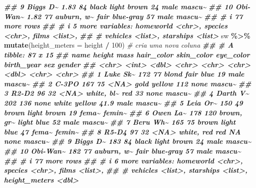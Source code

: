 \documentclass[
  portuguese,
  11pt,
  openany]{book}
\newenvironment{Shaded}{\begin{snugshade}}{\end{snugshade}}
\newcommand{\AttributeTok}[1]{\textcolor[rgb]{0.13,0.29,0.53}{#1}}
\newcommand{\CommentTok}[1]{\textcolor[rgb]{0.56,0.35,0.01}{\textit{#1}}}
\newcommand{\DecValTok}[1]{\textcolor[rgb]{0.00,0.00,0.81}{#1}}
\newcommand{\DocumentationTok}[1]{\textcolor[rgb]{0.56,0.35,0.01}{\textbf{\textit{#1}}}}
\newcommand{\FunctionTok}[1]{\textcolor[rgb]{0.13,0.29,0.53}{\textbf{#1}}}
\newcommand{\NormalTok}[1]{#1}
\newcommand{\SpecialCharTok}[1]{\textcolor[rgb]{0.81,0.36,0.00}{\textbf{#1}}}
\newcounter{none} %
\begin{document}
\begin{Shaded}
\begin{Highlighting}[]
\DocumentationTok{\#\#  9 Biggs D\textasciitilde{}   1.83    84 black      light      brown           24   male  mascu\textasciitilde{}}
\DocumentationTok{\#\# 10 Obi{-}Wan\textasciitilde{}   1.82    77 auburn, w\textasciitilde{} fair       blue{-}gray       57   male  mascu\textasciitilde{}}
\DocumentationTok{\#\# \# i 77 more rows}
\DocumentationTok{\#\# \# i 5 more variables: homeworld \textless{}chr\textgreater{}, species \textless{}chr\textgreater{}, films \textless{}list\textgreater{},}
\DocumentationTok{\#\# \#   vehicles \textless{}list\textgreater{}, starships \textless{}list\textgreater{}}
\NormalTok{sw }\SpecialCharTok{\%\textgreater{}\%} \FunctionTok{mutate}\NormalTok{(}\AttributeTok{height\_meters =}\NormalTok{ height }\SpecialCharTok{/} \DecValTok{100}\NormalTok{)   }\CommentTok{\# cria uma nova coluna}
\DocumentationTok{\#\# \# A tibble: 87 x 15}
\DocumentationTok{\#\#    name     height  mass hair\_color skin\_color eye\_color birth\_year sex   gender}
\DocumentationTok{\#\#    \textless{}chr\textgreater{}     \textless{}int\textgreater{} \textless{}dbl\textgreater{} \textless{}chr\textgreater{}      \textless{}chr\textgreater{}      \textless{}chr\textgreater{}          \textless{}dbl\textgreater{} \textless{}chr\textgreater{} \textless{}chr\textgreater{} }
\DocumentationTok{\#\#  1 Luke Sk\textasciitilde{}    172    77 blond      fair       blue            19   male  mascu\textasciitilde{}}
\DocumentationTok{\#\#  2 C{-}3PO       167    75 \textless{}NA\textgreater{}       gold       yellow         112   none  mascu\textasciitilde{}}
\DocumentationTok{\#\#  3 R2{-}D2        96    32 \textless{}NA\textgreater{}       white, bl\textasciitilde{} red             33   none  mascu\textasciitilde{}}
\DocumentationTok{\#\#  4 Darth V\textasciitilde{}    202   136 none       white      yellow          41.9 male  mascu\textasciitilde{}}
\DocumentationTok{\#\#  5 Leia Or\textasciitilde{}    150    49 brown      light      brown           19   fema\textasciitilde{} femin\textasciitilde{}}
\DocumentationTok{\#\#  6 Owen La\textasciitilde{}    178   120 brown, gr\textasciitilde{} light      blue            52   male  mascu\textasciitilde{}}
\DocumentationTok{\#\#  7 Beru Wh\textasciitilde{}    165    75 brown      light      blue            47   fema\textasciitilde{} femin\textasciitilde{}}
\DocumentationTok{\#\#  8 R5{-}D4        97    32 \textless{}NA\textgreater{}       white, red red             NA   none  mascu\textasciitilde{}}
\DocumentationTok{\#\#  9 Biggs D\textasciitilde{}    183    84 black      light      brown           24   male  mascu\textasciitilde{}}
\DocumentationTok{\#\# 10 Obi{-}Wan\textasciitilde{}    182    77 auburn, w\textasciitilde{} fair       blue{-}gray       57   male  mascu\textasciitilde{}}
\DocumentationTok{\#\# \# i 77 more rows}
\DocumentationTok{\#\# \# i 6 more variables: homeworld \textless{}chr\textgreater{}, species \textless{}chr\textgreater{}, films \textless{}list\textgreater{},}
\DocumentationTok{\#\# \#   vehicles \textless{}list\textgreater{}, starships \textless{}list\textgreater{}, height\_meters \textless{}dbl\textgreater{}}
\end{Highlighting}
\end{Shaded}
\end{document}
